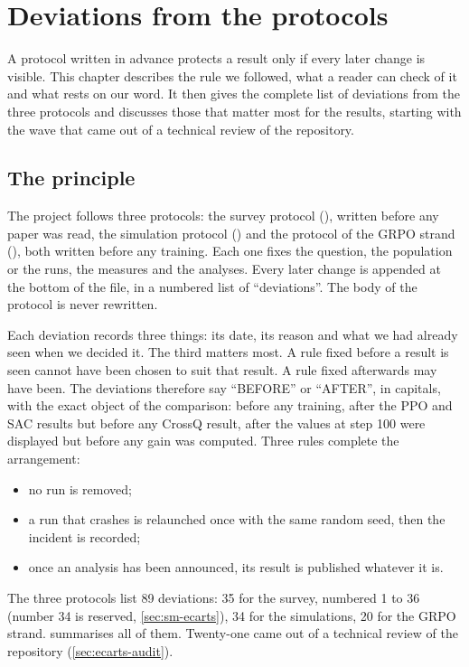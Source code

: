 \chapter{Deviations from the protocols}
\label{chap:09-ecarts}

A protocol written in advance protects a result only if every later change is visible. This chapter
describes the rule we followed, what a reader can check of it and what rests on our word. It then
gives the complete list of deviations from the three protocols and discusses those that matter most
for the results, starting with the wave that came out of a technical review of
the repository.

\section{The principle}
\label{sec:ecarts-principe}

The project follows three protocols: the survey protocol (),
written before any paper was read, the simulation protocol () and the
protocol of the GRPO strand (), both written before any training.
Each one fixes the question, the population or the runs, the measures and the analyses. Every later
change is appended at the bottom of the file, in a numbered list of \enquote{deviations}. The body
of the protocol is never rewritten.

Each deviation records three things: its date, its reason and what we had already seen when we
decided it. The third matters most. A rule fixed before a result is seen cannot have been chosen to
suit that result. A rule fixed afterwards may have been. The deviations therefore say
\enquote{BEFORE} or \enquote{AFTER}, in capitals, with the exact object of the comparison:
before any training, after the PPO and SAC results but before any CrossQ result, after the values
at step 100 were displayed but before any gain was computed. Three rules complete the arrangement:
\begin{itemize}
  \item no run is removed;
  \item a run that crashes is relaunched once with the same random seed, then the incident is
        recorded;
  \item once an analysis has been announced, its result is published whatever it is.
\end{itemize}

The three protocols list 89 deviations: 35 for the survey, numbered 1 to 36 (number 34 is
reserved, \cref{sec:sm-ecarts}), 34 for the simulations, 20 for the GRPO strand. 
summarises all of them. Twenty-one came out of a technical review of the repository
(\cref{sec:ecarts-audit}).

